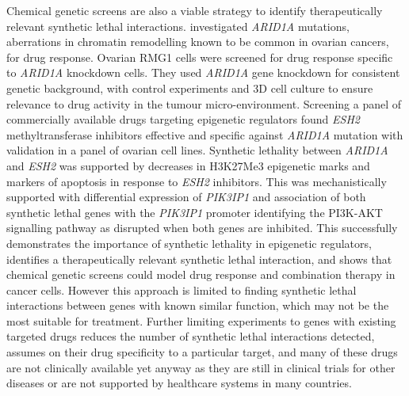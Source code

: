Chemical genetic screens are also a viable strategy to identify therapeutically relevant synthetic lethal interactions. \citet{Bitler2015} investigated \textit{ARID1A} mutations, aberrations in chromatin remodelling known to be common in ovarian cancers, for drug response. Ovarian RMG1 cells were screened for drug response specific to \textit{ARID1A} knockdown cells. They used \textit{ARID1A} gene knockdown for consistent genetic background, with control experiments and 3D cell culture to ensure relevance to drug activity in the tumour micro-environment. Screening a panel of commercially available drugs targeting epigenetic regulators found \textit{ESH2} methyltransferase inhibitors effective and specific against \textit{ARID1A} mutation with validation in a panel of ovarian cell lines. Synthetic lethality between \textit{ARID1A} and \textit{ESH2} was supported by decreases in H3K27Me3 epigenetic marks and markers of apoptosis in response to \textit{ESH2} inhibitors. This was mechanistically supported with differential expression of \textit{PIK3IP1} and association of both synthetic lethal genes with the \textit{PIK3IP1} promoter identifying the PI3K-AKT signalling pathway as disrupted when both genes are inhibited. This successfully demonstrates the importance of synthetic lethality in epigenetic regulators, identifies a therapeutically relevant synthetic lethal interaction, and shows that chemical genetic screens could model drug response and combination therapy in cancer cells. However this approach is limited to finding synthetic lethal interactions between genes with known similar function, which may not be the most suitable for treatment. Further limiting experiments to genes with existing targeted drugs reduces the number of synthetic lethal interactions detected, assumes on their drug specificity to a particular target, and many of these drugs are not clinically available yet anyway as they are still in clinical trials for other diseases or are not supported by healthcare systems in many countries.  

